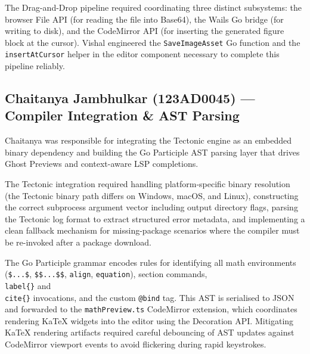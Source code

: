 \documentclass[11pt, a4paper]{article}
\begin{document}
The Drag-and-Drop pipeline required coordinating three distinct subsystems: the browser File API (for reading the file into Base64), the Wails Go bridge (for writing to disk), and the CodeMirror API (for inserting the generated figure block at the cursor). Vishal engineered the \texttt{SaveImageAsset} Go function and the \texttt{insertAtCursor} helper in the editor component necessary to complete this pipeline reliably.

\subsection{Chaitanya Jambhulkar (123AD0045) — Compiler Integration \& AST Parsing}

Chaitanya was responsible for integrating the Tectonic engine as an embedded binary dependency and building the Go Participle AST parsing layer that drives Ghost Previews and context-aware LSP completions.

The Tectonic integration required handling platform-specific binary resolution (the Tectonic binary path differs on Windows, macOS, and Linux), constructing the correct subprocess argument vector including output directory flags, parsing the Tectonic log format to extract structured error metadata, and implementing a clean fallback mechanism for missing-package scenarios where the compiler must be re-invoked after a package download.

The Go Participle grammar encodes rules for identifying all math environments (\texttt{\$...\$}, \texttt{\$\$...\$\$}, \texttt{align}, \texttt{equation}), section commands, \texttt{\\label\{\}} and \texttt{\\cite\{\}} invocations, and the custom \texttt{@bind} tag. This AST is serialised to JSON and forwarded to the \texttt{mathPreview.ts} CodeMirror extension, which coordinates rendering KaTeX widgets into the editor using the Decoration API. Mitigating KaTeX rendering artifacts required careful debouncing of AST updates against CodeMirror viewport events to avoid flickering during rapid keystrokes.
\end{document}
